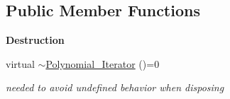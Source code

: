 \subsection*{Public Member Functions}
\begin{Indent}\textbf{ Destruction}\par
\begin{DoxyCompactItemize}
\item 
\mbox{\label{class_polynomial___iterator_a20e700b363cc17d2f8c015f4eca1030f}} 
virtual \hyperlink{class_polynomial___iterator_a20e700b363cc17d2f8c015f4eca1030f}{$\sim$\+Polynomial\+\_\+\+Iterator} ()=0
\begin{DoxyCompactList}\small\item\em needed to avoid undefined behavior when disposing \end{DoxyCompactList}\end{DoxyCompactItemize}
\end{Indent}
